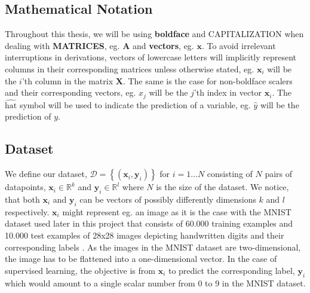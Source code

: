 \documentclass[a4paper,11pt]{article} %
\begin{document}
\subsection{Mathematical Notation}
Throughout this thesis, we will be using \textbf{boldface} and CAPITALIZATION when dealing with \textbf{MATRICES}, eg. $\mathbf{A}$ and \textbf{vectors}, eg. $\mathbf{x}$. To avoid irrelevant interruptions in derivations, vectors of lowercase letters will implicitly represent columns in their corresponding matrices unless otherwise stated, eg. $\mathbf{x}_i$ will be the $i$'th column in the matrix $\mathbf{X}$. The same is the case for non-boldface scalers and their corresponding vectors, eg. $x_j$ will be the $j$'th index in vector $\mathbf{x}_i$. The $\hat{\text{hat}}$ symbol will be used to indicate the prediction of a variable, eg. $\hat{y}$ will be the prediction of $y$. 

\subsection{Dataset}

We define our dataset, $\mathcal{D} = \left\{(\mathbf{x}_i, \mathbf{y}_i)\right\}$ for $i = 1 \ldots N$ consisting of $N$ pairs of datapoints, $\mathbf{x}_i \in \mathbb{R}^k$ and $\mathbf{y}_i \in \mathbb{R}^l$ where $N$ is the size of the dataset. We notice, that both $\mathbf{x}_i$ and $\mathbf{y}_i$ can be vectors of possibly differently dimensions $k$ and $l$ respectively. $\mathbf{x}_i$ might represent eg. an image as it is the case with the MNIST dataset used later in this project that consists of 60.000 training examples and 10.000 test examples of 28x28 images depicting handwritten digits and their corresponding labels \cite{mnist}. As the images in the MNIST dataset are two-dimensional, the image has to be flattened into a one-dimensional vector. In the case of supervised learning, the objective is from $\mathbf{x}_i$ to predict the corresponding label, $\mathbf{y}_i$ which would amount to a single scalar number from 0 to 9 in the MNIST dataset. 
\end{document}
